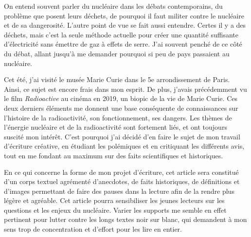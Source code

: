 \documentclass[17pt, a4paper]{extarticle}
\begin{document}
\color{lightgray}

On entend souvent parler du nucléaire dans les débats contemporains, du problème que posent leurs déchets, de pourquoi il faut militer contre le nucléaire et de sa dangerosité. L'autre point de vue se fait aussi entendre. Certes il y a des déchets, mais c'est la seule méthode actuelle pour créer une quantité suffisante d'électricité sans émettre de gaz à effets de serre. J'ai souvent penché de ce côté du débat, allant jusqu'à me demander pourquoi si peu de pays passaient au nucléaire.

Cet été, j'ai visité le musée Marie Curie dans le 5e arrondissement de Paris. Ainsi, ce sujet est encore frais dans mon esprit. De plus, j'avais précédemment vu le film {\itshape Radioactive} au cinéma en 2019, un biopic de la vie de Marie Curie. Ces deux derniers éléments me donnent une base conséquente de connaissances sur l'histoire de la radioactivité, son fonctionnement, ses dangers. Les thèmes de l'énergie nucléaire et de la radioactivité sont fortement liés, et ont toujours suscité mon intérêt. C'est pourquoi j'ai décidé d'en faire le sujet de mon travail d'écriture créative, en étudiant les polémiques et en critiquant les différents avis, tout en me fondant au maximum sur des faits scientifiques et historiques.

En ce qui concerne la forme de mon projet d'écriture, cet article sera constitué d'un corps textuel agrémenté d'anecdotes, de faits historiques, de définitions et d'images permettant de faire des pauses dans la lecture afin de la rendre plus légère et agréable. Cet article pourra sensibiliser les jeunes lecteurs sur les questions et les enjeux du nucléaire. Varier les supports me semble en effet pertinent pour lutter contre les longs textes noir sur blanc, qui demandent à mon sens trop de concentration et d'effort pour les lire en entier.
\end{document}

